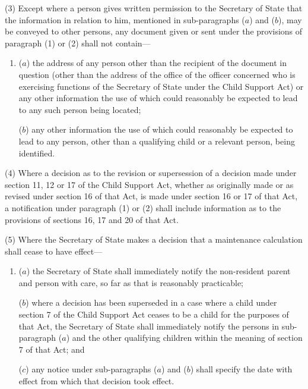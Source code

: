 \documentclass[12pt,a4paper]{article}
\begin{document}
(3) Except where a person gives written permission to the 
Secretary of State  %
that the information in relation to him, mentioned in sub-paragraphs ($a$)  and ($b$), may be conveyed to other persons, any document given or sent under the provisions of paragraph (1) or (2) shall not contain—
\begin{enumerate}\item[]
($a$) the address of any person other than the recipient of the document in question (other than the address of the office of the officer concerned who is exercising functions of the 
Secretary of State  %
under the Child Support Act) or any other information the use of which could reasonably be expected to lead to any such person being located;

($b$) any other information the use of which could reasonably be expected to lead to any person, other than a qualifying child or a relevant person, being identified.
\end{enumerate}

(4) Where a decision as to the revision or supersession of a decision made under section 11, 12 or 17 of the Child Support Act, whether as originally made or as revised under section 16 of that Act, is made under section 16 or 17 of that Act, a notification under paragraph (1) or (2) shall include information as to the provisions of sections 16, 17 and 20 of that Act.

(5) Where the 
Secretary of State  %
makes a decision that a maintenance calculation shall cease to have effect—
\begin{enumerate}\item[]
($a$) 
the Secretary of State  %
shall immediately notify the non-resident parent and person with care, so far as that is reasonably practicable;

($b$) where a decision has been superseded in a case where a child under section 7 of the Child Support Act ceases to be a child for the purposes of that Act, 
the Secretary of State  %
shall immediately notify the persons in sub-paragraph ($a$)  and the other qualifying children within the meaning of section 7 of that Act; and

($c$) any notice under sub-paragraphs ($a$)  and ($b$)  shall specify the date with effect from which that decision took effect.
\end{enumerate}
\end{document}
